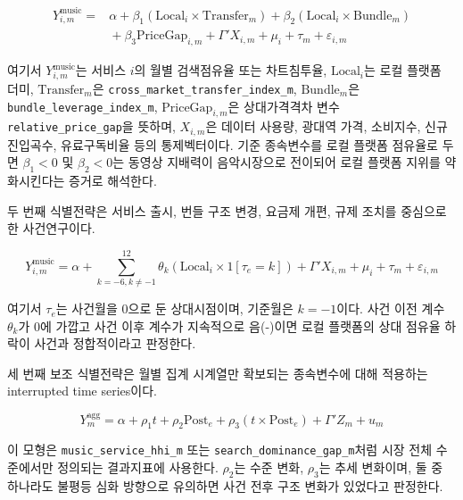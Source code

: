 \documentclass[11pt,a4paper]{report}
\begin{document}
\begin{equation}
\label{eq:music_panel_fe}
\begin{aligned}
Y_{i,m}^{\mathrm{music}} ={}& \alpha + \beta_1 \left(\mathrm{Local}_i \times \mathrm{Transfer}_m\right) + \beta_2 \left(\mathrm{Local}_i \times \mathrm{Bundle}_m\right) \\
& {}+ \beta_3 \mathrm{PriceGap}_{i,m} + \Gamma' X_{i,m} + \mu_i + \tau_m + \varepsilon_{i,m}
\end{aligned}
\end{equation}

여기서 $Y_{i,m}^{\mathrm{music}}$는 서비스 $i$의 월별 검색점유율 또는 차트침투율, $\mathrm{Local}_i$는 로컬 플랫폼 더미, $\mathrm{Transfer}_m$은 \nolinkurl{cross_market_transfer_index_m}, $\mathrm{Bundle}_m$은 \texttt{bundle\_leverage\_index\_m}, $\mathrm{PriceGap}_{i,m}$은 상대가격격차 변수 \texttt{relative\_price\_gap}을 뜻하며, $X_{i,m}$은 데이터 사용량, 광대역 가격, 소비지수, 신규진입곡수, 유료구독비율 등의 통제벡터이다. 기준 종속변수를 로컬 플랫폼 점유율로 두면 $\beta_1 < 0$ 및 $\beta_2 < 0$는 동영상 지배력이 음악시장으로 전이되어 로컬 플랫폼 지위를 약화시킨다는 증거로 해석한다.

두 번째 식별전략은 서비스 출시, 번들 구조 변경, 요금제 개편, 규제 조치를 중심으로 한 사건연구이다.

\begin{equation}
\label{eq:music_event_study}
Y_{i,m}^{\mathrm{music}} = \alpha + \sum_{k=-6, k \neq -1}^{12} \theta_k \left(\mathrm{Local}_i \times 1[\tau_e = k]\right) + \Gamma' X_{i,m} + \mu_i + \tau_m + \varepsilon_{i,m}
\end{equation}

여기서 $\tau_e$는 사건월을 0으로 둔 상대시점이며, 기준월은 $k=-1$이다. 사건 이전 계수 $\theta_k$가 0에 가깝고 사건 이후 계수가 지속적으로 음(-)이면 로컬 플랫폼의 상대 점유율 하락이 사건과 정합적이라고 판정한다.

세 번째 보조 식별전략은 월별 집계 시계열만 확보되는 종속변수에 대해 적용하는 interrupted time series이다.

\begin{equation}
\label{eq:music_its}
Y_{m}^{\mathrm{agg}} = \alpha + \rho_1 t + \rho_2 \mathrm{Post}_e + \rho_3 \left(t \times \mathrm{Post}_e\right) + \Gamma' Z_m + u_m
\end{equation}

이 모형은 \texttt{music\_service\_hhi\_m} 또는 \texttt{search\_dominance\_gap\_m}처럼 시장 전체 수준에서만 정의되는 결과지표에 사용한다. $\rho_2$는 수준 변화, $\rho_3$는 추세 변화이며, 둘 중 하나라도 불평등 심화 방향으로 유의하면 사건 전후 구조 변화가 있었다고 판정한다.
\end{document}
